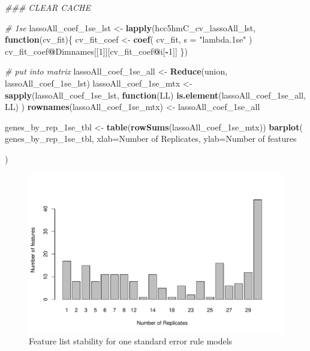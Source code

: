 \documentclass[
]{book}
\newenvironment{Shaded}{\begin{snugshade}}{\end{snugshade}}
\newcommand{\CommentTok}[1]{\textcolor[rgb]{0.56,0.35,0.01}{\textit{#1}}}
\newcommand{\ControlFlowTok}[1]{\textcolor[rgb]{0.13,0.29,0.53}{\textbf{#1}}}
\newcommand{\DataTypeTok}[1]{\textcolor[rgb]{0.13,0.29,0.53}{#1}}
\newcommand{\DecValTok}[1]{\textcolor[rgb]{0.00,0.00,0.81}{#1}}
\newcommand{\KeywordTok}[1]{\textcolor[rgb]{0.13,0.29,0.53}{\textbf{#1}}}
\newcommand{\NormalTok}[1]{#1}
\newcommand{\OperatorTok}[1]{\textcolor[rgb]{0.81,0.36,0.00}{\textbf{#1}}}
\newcommand{\StringTok}[1]{\textcolor[rgb]{0.31,0.60,0.02}{#1}}
\begin{document}
\begin{Shaded}
\begin{Highlighting}[]
\CommentTok{\#\#\# CLEAR CACHE}


\CommentTok{\# 1se}
\NormalTok{lassoAll\_coef\_1se\_lst <{-}}\StringTok{ }\KeywordTok{lapply}\NormalTok{(hcc5hmC\_cv\_lassoAll\_lst, }\ControlFlowTok{function}\NormalTok{(cv\_fit)\{}
\NormalTok{ cv\_fit\_coef <{-}}\StringTok{ }\KeywordTok{coef}\NormalTok{(}
\NormalTok{ cv\_fit,}
 \DataTypeTok{s =} \StringTok{"lambda.1se"}
\NormalTok{ )}
\NormalTok{ cv\_fit\_coef}\OperatorTok{@}\NormalTok{Dimnames[[}\DecValTok{1}\NormalTok{]][cv\_fit\_coef}\OperatorTok{@}\NormalTok{i[}\OperatorTok{{-}}\DecValTok{1}\NormalTok{]]}
\NormalTok{ \})}

\CommentTok{\# put into matrix}
\NormalTok{lassoAll\_coef\_1se\_all <{-}}\StringTok{ }\KeywordTok{Reduce}\NormalTok{(union, lassoAll\_coef\_1se\_lst)}
\NormalTok{lassoAll\_coef\_1se\_mtx <{-}}\StringTok{ }\KeywordTok{sapply}\NormalTok{(lassoAll\_coef\_1se\_lst, }
  \ControlFlowTok{function}\NormalTok{(LL) }\KeywordTok{is.element}\NormalTok{(lassoAll\_coef\_1se\_all, LL)}
\NormalTok{)}
\KeywordTok{rownames}\NormalTok{(lassoAll\_coef\_1se\_mtx) <{-}}\StringTok{ }\NormalTok{lassoAll\_coef\_1se\_all}

\NormalTok{genes\_by\_rep\_1se\_tbl <{-}}\StringTok{ }\KeywordTok{table}\NormalTok{(}\KeywordTok{rowSums}\NormalTok{(lassoAll\_coef\_1se\_mtx))}
\KeywordTok{barplot}\NormalTok{(}
\NormalTok{ genes\_by\_rep\_1se\_tbl,}
 \DataTypeTok{xlab=}\StringTok{\textquotesingle{}Number of Replicates\textquotesingle{}}\NormalTok{,}
 \DataTypeTok{ylab=}\StringTok{\textquotesingle{}Number of features\textquotesingle{}}

\NormalTok{)}
\end{Highlighting}
\end{Shaded}

\begin{figure}
\centering
\includegraphics{Static/figures/hcc5hmC-glmnetSuite-feature-list-1se-1.pdf}
\caption{\label{fig:hcc5hmC-glmnetSuite-feature-list-1se}Feature list stability for one standard error rule models}
\end{figure}
\end{document}
